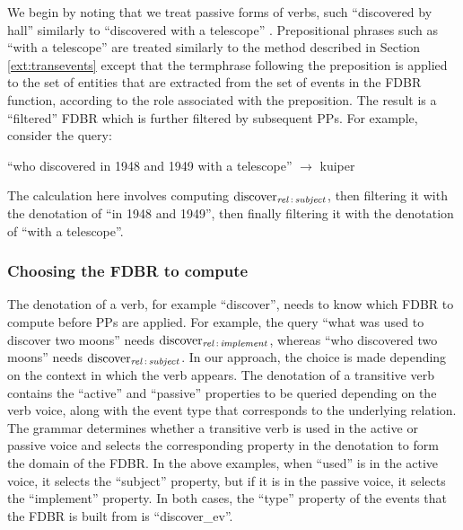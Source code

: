 \documentclass[../main.tex]{subfiles}
\begin{document}
\begin{refsection}
We begin by noting that we treat passive forms of verbs, such ``discovered by hall'' similarly to
``discovered with a telescope'' \cite{peelar2016accommodating}. Prepositional phrases such as ``with a telescope'' are treated similarly to the method described in Section \ref{ext:transevents} except that
the termphrase following the preposition is applied to the set of entities that are extracted
from the set of events in the FDBR function, according to the role associated with the preposition. The
result is a ``filtered'' FDBR which is further filtered by subsequent PPs. For
example, consider the query:

``who discovered in 1948 and 1949 with a telescope'' $\rightarrow$ kuiper

The calculation here involves computing $\operatorname{discover}_{\operatorname{\mathit{rel}}\,:\,\operatorname{\mathit{subject}}}$, then filtering it with the denotation of ``in 1948 and 1949'', then finally filtering it with the denotation of ``with a telescope''. %

\subsubsection{Choosing the FDBR to compute}
\label{ext:choosingfdbr}

The denotation of a verb, for example ``discover'', needs to know which FDBR to compute
before PPs are applied. For example, the query ``what was used to discover
two moons'' needs $\operatorname{discover}_{\operatorname{\mathit{rel}}\,:\,\operatorname{\mathit{implement}}}$, whereas ``who discovered two moons'' needs
$\operatorname{discover}_{\operatorname{\mathit{rel}}\,:\,\operatorname{\mathit{subject}}}$. In our approach, the choice is made depending on the context in
which the verb appears. The denotation of a transitive verb contains the ``active'' and ``passive'' properties to be queried depending
on the verb voice, along with the event type that corresponds to the underlying relation. The grammar determines whether a transitive verb is used in the active or passive voice and selects the corresponding property in the denotation to form the domain of the FDBR. In the above examples, when ``used'' is in the active voice, it selects the ``subject'' property, but if it is in the passive voice, it selects the ``implement'' property. In both cases, the ``type'' property of the events that the FDBR is built from is ``discover\_ev''.




\end{refsection}
\end{document}
